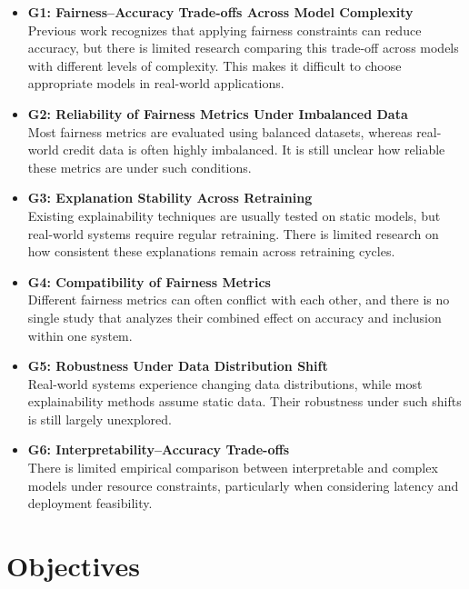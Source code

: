 \begin{itemize}
    \item \textbf{G1: Fairness--Accuracy Trade-offs Across Model Complexity} \\
    Previous work recognizes that applying fairness constraints can reduce accuracy, but there is limited research comparing this trade-off across models with different levels of complexity. This makes it difficult to choose appropriate models in real-world applications.

    \item \textbf{G2: Reliability of Fairness Metrics Under Imbalanced Data} \\
    Most fairness metrics are evaluated using balanced datasets, whereas real-world credit data is often highly imbalanced. It is still unclear how reliable these metrics are under such conditions.

    \item \textbf{G3: Explanation Stability Across Retraining} \\
    Existing explainability techniques are usually tested on static models, but real-world systems require regular retraining. There is limited research on how consistent these explanations remain across retraining cycles.

    \item \textbf{G4: Compatibility of Fairness Metrics} \\
    Different fairness metrics can often conflict with each other, and there is no single study that analyzes their combined effect on accuracy and inclusion within one system.

    \item \textbf{G5: Robustness Under Data Distribution Shift} \\
    Real-world systems experience changing data distributions, while most explainability methods assume static data. Their robustness under such shifts is still largely unexplored.

    \item \textbf{G6: Interpretability--Accuracy Trade-offs} \\
    There is limited empirical comparison between interpretable and complex models under resource constraints, particularly when considering latency and deployment feasibility.
\end{itemize}

\section{Objectives}

